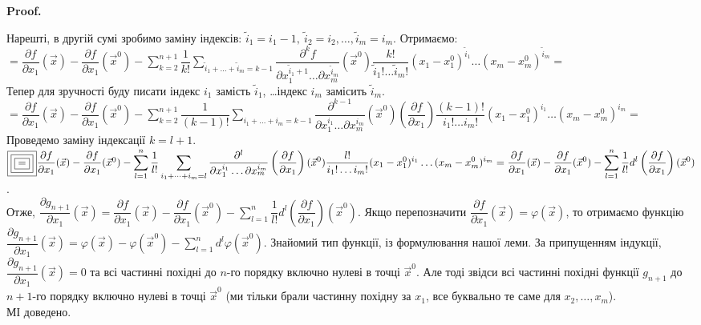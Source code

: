 \documentclass[a4paper, 10pt]{article}
\makeatletter
\def\departial#1#2{\dfrac{\partial {#1}}{\partial {#2}}}
\theoremstyle{theoremdd}
\theoremstyle{theoremdd}
\theoremstyle{theoremdd}
\theoremstyle{theoremdd}
\theoremstyle{theoremdd}
\theoremstyle{theoremdd}
\theoremstyle{theoremdd}
\theoremstyle{theoremdd}
\theoremstyle{theoremdd}
\renewenvironment{proof}[1][Proof.\\]{\par
\pushQED{\hfill \qed}%
\normalfont \topsep6\p@\@plus6\p@\relax
\trivlist
\item\relax
{\bfseries
#1\@addpunct{.}}\hspace\labelsep\ignorespaces
}{%
\popQED\endtrivlist\@endpefalse
}
\makeatother
\begin{document}
\begin{proof}
Нарешті, в другій сумі зробимо заміну індексів: $\tilde{i}_1 = i_1 - 1,\ \tilde{i}_2 = i_2, \dots, \tilde{i}_m = i_m$. Отримаємо:\\
$\boxed{=} \departial{f}{x_1}(\vec{x}) - \departial{f}{x_1}(\vec{x}^0) - \displaystyle\sum_{k=2}^{n+1} \dfrac{1}{k!} \sum_{\tilde{i}_1 + \dots + \tilde{i}_m = k-1} \dfrac{\partial^k f}{\partial x_1^{\tilde{i}_1 + 1} \dots \partial x_m^{\tilde{i}_m}} (\vec{x}^0) \dfrac{k!}{\tilde{i}_1 ! \dots \tilde{i}_m !} (x_1 - x_1^0)^{\tilde{i}_1} \dots (x_m - x_m^0)^{\tilde{i}_m} \boxed{\boxed{=}}$\\
Тепер для зручності буду писати індекс $i_1$ замість $\tilde{i}_1$, \dots індекс $i_m$ замісить $\tilde{i}_m$.\\
$\boxed{\boxed{=}} \departial{f}{x_1}(\vec{x}) - \departial{f}{x_1}(\vec{x}^0) - \displaystyle\sum_{k=2}^{n+1} \dfrac{1}{(k-1)!} \sum_{i_1 + \dots + i_m = k-1} \dfrac{\partial^{k-1}}{\partial x_1^{i_1} \dots \partial x_m^{i_m}}(\vec{x}^0) \left( \departial{f}{x_1}\right) \dfrac{(k-1)!}{i_1 ! \dots i_m !} (x_1 - x_1^0)^{i_1} \dots (x_m - x_m^0)^{i_m} \boxed{\boxed{\boxed{=}}}$\\
Проведемо заміну індексації $k = l + 1$.\\
$\boxed{\boxed{\boxed{=}}} \departial{f}{x_1}(\vec{x}) - \departial{f}{x_1}(\vec{x}^0) - \displaystyle \sum_{l=1}^n \dfrac{1}{l!} \sum_{i_1 + \dots + i_m = l} \dfrac{\partial^l}{\partial x_1^{i_1} \dots \partial x_m^{i_m}} \left( \departial{f}{x_1} \right) (\vec{x}^0) \dfrac{l!}{i_1 ! \dots i_m !} (x_1 - x_1^0)^{i_1} \dots (x_m - x_m^0)^{i_m} \\
= \departial{f}{x_1}(\vec{x}) - \departial{f}{x_1}(\vec{x}^0) - \sum_{l=1}^n \dfrac{1}{l!} d^l \left( \departial{f}{x_1}\right)(\vec{x}^0)$.\\
Отже, $\departial{g_{n+1}}{x_1}(\vec{x}) = \departial{f}{x_1}(\vec{x}) - \departial{f}{x_1}(\vec{x}^0) - \displaystyle\sum_{l=1}^n \dfrac{1}{l!} d^l \left( \departial{f}{x_1}\right)(\vec{x}^0)$. Якщо перепозначити $\departial{f}{x_1}(\vec{x}) = \varphi(\vec{x})$, то отримаємо функцію $\departial{g_{n+1}}{x_1}(\vec{x}) = \varphi(\vec{x}) - \varphi(\vec{x}^0) - \displaystyle\sum_{l=1}^n d^l \varphi(\vec{x}^0)$. Знайомий тип функції, із формулювання нашої леми. За припущенням індукції, $\departial{g_{n+1}}{x_1}(\vec{x}) = 0$ та всі частинні похідні до $n$-го порядку включно нулеві в точці $\vec{x}^0$. Але тоді звідси всі частинні похідні функції $g_{n+1}$ до $n+1$-го порядку включно нулеві в точці $\vec{x}^0$ (ми тільки брали частинну похідну за $x_1$, все буквально те саме для $x_2,\dots,x_m$).\\
МІ доведено.
\end{proof}
\end{document}
